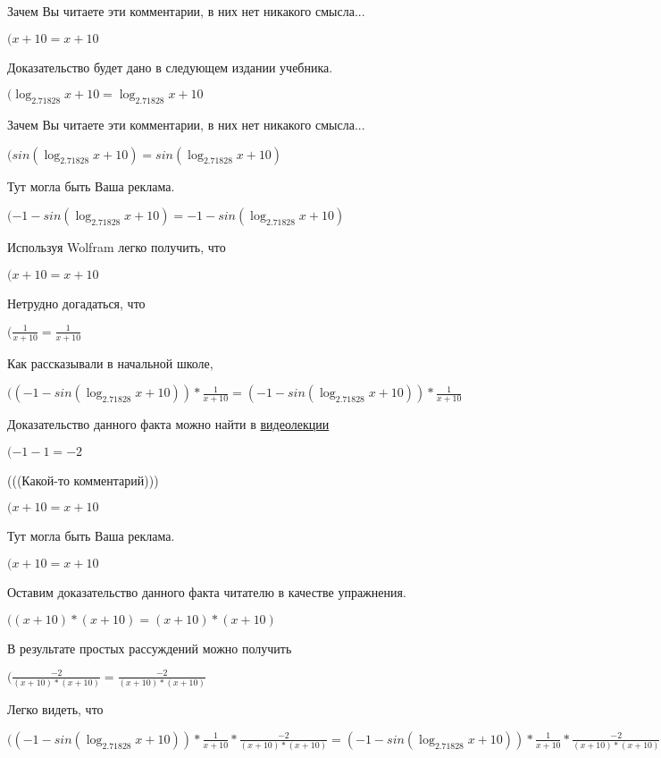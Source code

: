 \documentclass[12pt,a4paper,fleqn]{article}
\theoremstyle{definition}
\begin{document}
Зачем Вы читаете эти комментарии, в них нет никакого смысла...

$( x  +  10  =  x  +  10 $

Доказательство будет дано в следующем издании учебника.

$(\log_{ 2.71828 }{ x  +  10 } = \log_{ 2.71828 }{ x  +  10 }$

Зачем Вы читаете эти комментарии, в них нет никакого смысла...

$(sin(\log_{ 2.71828 }{ x  +  10 }) = sin(\log_{ 2.71828 }{ x  +  10 })$

Тут могла быть Ваша реклама.

$( -1  - sin(\log_{ 2.71828 }{ x  +  10 }) =  -1  - sin(\log_{ 2.71828 }{ x  +  10 })$

Используя Wolfram легко получить, что

$( x  +  10  =  x  +  10 $

Нетрудно догадаться, что

$(\frac{ 1 }{ x  +  10 }
 = \frac{ 1 }{ x  +  10 }
$

Как рассказывали в начальной школе,

$(( -1  - sin(\log_{ 2.71828 }{ x  +  10 })) * \frac{ 1 }{ x  +  10 }
 = ( -1  - sin(\log_{ 2.71828 }{ x  +  10 })) * \frac{ 1 }{ x  +  10 }
$

Доказательство данного факта можно найти в \href{https://www.youtube.com/watch?v=dQw4w9WgXcQ}{видеолекции}

$( -1  -  1  =  -2 $

(((Какой-то комментарий)))

$( x  +  10  =  x  +  10 $

Тут могла быть Ваша реклама.

$( x  +  10  =  x  +  10 $

Оставим доказательство данного факта читателю в качестве упражнения.

$(( x  +  10 ) * ( x  +  10 ) = ( x  +  10 ) * ( x  +  10 )$

В результате простых рассуждений можно получить

$(\frac{ -2 }{( x  +  10 ) * ( x  +  10 )}
 = \frac{ -2 }{( x  +  10 ) * ( x  +  10 )}
$

Легко видеть, что

$(( -1  - sin(\log_{ 2.71828 }{ x  +  10 })) * \frac{ 1 }{ x  +  10 }
 * \frac{ -2 }{( x  +  10 ) * ( x  +  10 )}
 = ( -1  - sin(\log_{ 2.71828 }{ x  +  10 })) * \frac{ 1 }{ x  +  10 }
 * \frac{ -2 }{( x  +  10 ) * ( x  +  10 )}
$
\end{document}
